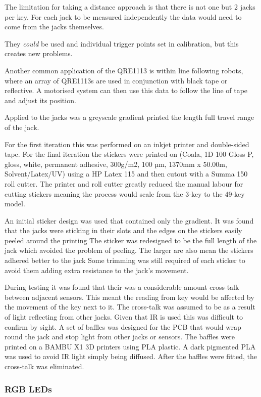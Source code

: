 The limitation for taking a distance approach is that there is not one
but 2 jacks per key. For each jack to be measured independently the data
would need to come from the jacks themselves.

They \emph{could} be used and individual trigger points set in
calibration, but this creates new problems.


Another common application of the QRE1113 is within line following
robots, where an array of QRE1113s are used in conjunction with black
tape or reflective. A motorised system can then use this data to follow the line of tape and adjust its position.

Applied to the jacks was a greyscale gradient printed the length full
travel range of the jack.

For the first iteration this was performed on an inkjet printer and
double-sided tape. For the final iteration the stickers were printed on
(Coala, 1D 100 Gloss P, gloss, white, permanent adhesive, 300g/m2, 100
µm, 1370mm x 50.00m, Solvent/Latex/UV) using a HP Latex 115 and then
cutout with a Summa 150 roll cutter. The printer and roll cutter greatly
reduced the manual labour for cutting stickers meaning the process would
scale from the 3-key to the 49-key model.

An initial sticker design was used that contained only the gradient. It
was found that the jacks were sticking in their slots and the edges on the
stickers easily peeled around the printing The sticker was redesigned to
be the full length of the jack which avoided the problem of peeling. The
larger are also mean the stickers adhered better to the jack Some
trimming was still required of each sticker to avoid them adding extra
resistance to the jack's movement.

During testing it was found that their was a considerable amount
cross-talk between adjacent sensors. This meant the reading from key
would be affected by the movement of the key next to it. The cross-talk
was assumed to be as a result of light reflecting from other jacks.
Given that IR is used this was difficult to confirm by sight. A set of
baffles was designed for the PCB that would wrap round the jack and stop
light from other jacks or sensors. The baffles were printed on a BAMBU X1 3D
printers using PLA plastic. A dark pigmented PLA was used to avoid IR
light simply being diffused. After the baffles were fitted, the
cross-talk was eliminated.


\subsubsection{RGB LEDs}\label{rgb-leds}

